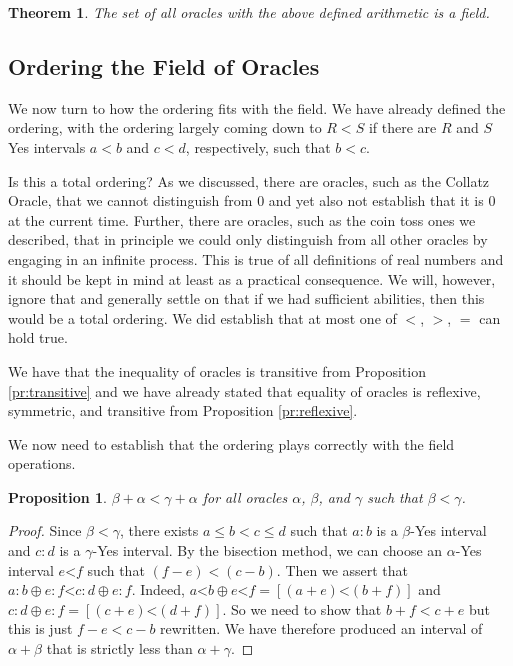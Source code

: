 \documentclass[12pt]{article}
\newtheorem{theorem}{Theorem}
\newtheorem{proposition}{Proposition}
\theoremstyle{remark}
\newcommand{\lt}{\mathord{<}}
\begin{document}
\begin{theorem}
The set of all oracles with the above defined arithmetic is a field. 
\end{theorem}

\subsection{Ordering the Field of Oracles}

We now turn to how the ordering fits with the field. We have already defined the ordering, with the ordering largely coming down to $R < S$ if there are $R$ and $S$ Yes intervals $a<b$ and $c<d$, respectively, such that $b<c$. 

Is this a total ordering? As we discussed, there are oracles, such as the Collatz Oracle, that we cannot distinguish from 0 and yet also not establish that it is 0 at the current time. Further, there are oracles, such as the coin toss ones we described, that in principle we could only distinguish from all other oracles by engaging in an infinite process. This is true of all definitions of real numbers and it should be kept in mind at least as a practical consequence. We will, however,  ignore that and generally settle on that if we had sufficient abilities, then this would be a total ordering. We did establish that at most one of $<$, $>$, $=$ can hold true. 

We have that the inequality of oracles is transitive from Proposition \ref{pr:transitive} and we have already stated that equality of oracles is reflexive, symmetric, and transitive from Proposition \ref{pr:reflexive}. 

We now need to establish that the ordering plays correctly with the field operations. 

\begin{proposition}\label{pr:addinq}
 $\beta + \alpha< \gamma + \alpha$ for all oracles $\alpha$, $\beta$, and $\gamma$ such that $\beta < \gamma$.
\end{proposition}

\begin{proof}
Since $\beta < \gamma$, there exists $a\leq b<c\leq d$ such that $a:b$ is a $\beta$-Yes interval and $c:d$ is a $\gamma$-Yes interval. By the bisection method, we can choose an $\alpha$-Yes interval $e\lt f$ such that $ (f-e) <  (c-b)$. Then we assert that $a:b \oplus e:f \lt  c:d \oplus e:f$. Indeed, $a\lt b \oplus e \lt f = [(a+e) \lt (b+f)]$ and $c:d \oplus e:f = [(c+e)\lt (d+f)]$. So we need to show that $b+f< c+e$ but this is just $f-e < c-b$ rewritten. We have therefore produced an interval of $\alpha+\beta$ that is strictly less than $\alpha+\gamma$. 
\end{proof}
\end{document}
